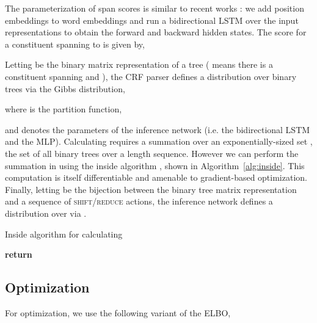 \documentclass[11pt,a4paper]{article}
\begin{document}
 The parameterization of span scores is similar to recent works \cite{wang2016graph,stern2017minimal,kitaev2018parsing}: we add position embeddings to word embeddings and run a bidirectional LSTM over the input representations to obtain the forward  and backward  hidden states. The score  for a constituent spanning  to  is given by,
\vspace{-1mm}

Letting  be the binary matrix
representation of a tree ( means there is a constituent spanning  and ), the CRF parser defines a distribution over binary trees via the Gibbs distribution,
\vspace{-1mm}

where   is the partition function,
\vspace{-1mm}

and  denotes the parameters of the inference network (i.e. the bidirectional LSTM and the MLP). Calculating  requires a summation over an exponentially-sized set , the set of all binary trees over a length  sequence. However we can perform the summation in  using the inside algorithm \cite{baker1979io}, shown in Algorithm~\ref{alg:inside}. This computation is itself differentiable and amenable to gradient-based optimization.
Finally, letting  be the bijection between the  binary tree matrix representation  and a sequence of \textsc{shift}/\textsc{reduce} actions, the inference network defines a distribution over  via  .
\begin{algorithm}[t]
    \caption{Inside algorithm for calculating }
    \label{alg:inside}
    \begin{algorithmic}[1]  
       
                    \State 
                    \EndFor
             
             
            \State  {}
            \State 
            \EndFor
            \EndFor
            \State \textbf{return} 
        \EndProcedure
    \end{algorithmic}
\end{algorithm}

\vspace{-2mm}
\subsection{Optimization}
\vspace{-1mm}
\label{sec:opt}
For optimization, we use the following variant of the ELBO, 
\vspace{-2mm}
\end{document}
